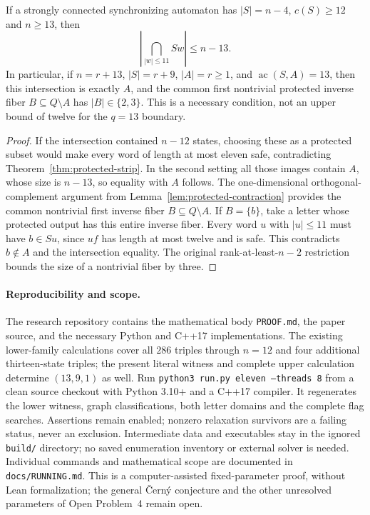 \documentclass[10pt]{article}
\newcommand{\ac}{\operatorname{ac}}
\begin{document}
\begin{corollary}
\label{cor:protected-intersection}
If a strongly connected synchronizing automaton has
$|S|=n-4$, $c(S)\ge12$ and $n\ge13$, then
\[
 \left|\bigcap_{|w|\le11}Sw\right|\le n-13.
\]
In particular, if $n=r+13$, $|S|=r+9$, $|A|=r\ge1$,
and $\ac(S,A)=13$, then this intersection is exactly $A$,
and the common first nontrivial protected inverse fiber
$B\subseteq Q\setminus A$ has $|B|\in\{2,3\}$.
This is a necessary condition, not an upper bound of twelve
for the $q=13$ boundary.
\end{corollary}
\begin{proof}
If the intersection contained $n-12$ states,
choosing these as a protected subset would make every word
of length at most eleven safe, contradicting
Theorem~\ref{thm:protected-strip}. In the second setting
all those images contain $A$, whose size is $n-13$,
so equality with $A$ follows. The one-dimensional
orthogonal-complement argument from Lemma~\ref{lem:protected-contraction}
provides the common nontrivial first inverse fiber
$B\subseteq Q\setminus A$. If $B=\{b\}$, take a letter
whose protected output has this entire inverse fiber.
Every word $u$ with $|u|\le11$ must have $b\in Su$,
since $uf$ has length at most twelve and is safe.
This contradicts $b\notin A$ and the intersection equality.
The original rank-at-least-$n-2$ restriction bounds the
size of a nontrivial fiber by three.
\end{proof}

\paragraph{Reproducibility and scope.}
The research repository contains the mathematical body \texttt{PROOF.md},
the paper source, and the necessary Python and C++17 implementations.
The existing lower-family calculations cover all $286$ triples through
$n=12$ and four additional thirteen-state triples; the present literal
witness and complete upper calculation determine $(13,9,1)$ as well.
Run \texttt{python3 run.py eleven --threads 8} from a clean source checkout
with Python 3.10+ and a C++17 compiler. It regenerates the lower witness,
graph classifications, both letter domains and the complete flag searches.
Assertions remain enabled; nonzero relaxation survivors are a failing
status, never an exclusion. Intermediate data and executables stay in the
ignored \texttt{build/} directory; no saved enumeration inventory or
external solver is needed. Individual commands and mathematical scope
are documented in \texttt{docs/RUNNING.md}.
This is a computer-assisted fixed-parameter proof, without Lean
formalization; the general \v{C}ern\'y conjecture and the other unresolved
parameters of Open Problem~4 remain open.
\end{document}
